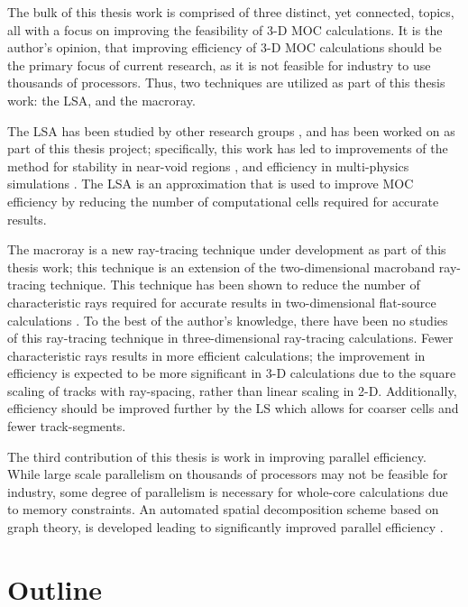 {{        The bulk of this thesis work is comprised of three distinct, yet connected, topics, all with a focus on improving the feasibility of 3-D \ac{MOC} calculations.
        It is the author's opinion, that improving efficiency of 3-D \ac{MOC} calculations should be the primary focus of current research, as it is not feasible for industry to use thousands of processors.
        Thus, two techniques are utilized as part of this thesis work: the \acf{LSA}, and the macroray.

        The \ac{LSA} has been studied by other research groups \cite{Ferrer2016,Ferrer2018,Gunow2018}, and has been worked on as part of this thesis project; specifically, this work has led to improvements of the method for stability in near-void regions \cite{Fitzgerald2018}, and efficiency in multi-physics simulations \cite{Fitzgerald2019}.
        The \ac{LSA} is an approximation that is used to improve \ac{MOC} efficiency by reducing the number of computational cells required for accurate results.

        The macroray is a new ray-tracing technique under development as part of this thesis work; this technique is an extension of the two-dimensional macroband \cite{Villarino1992} ray-tracing technique.
        This technique has been shown to reduce the number of characteristic rays required for accurate results in two-dimensional flat-source calculations \cite{Yamamoto2005,Fevotte2007}.
        To the best of the author's knowledge, there have been no studies of this ray-tracing technique in three-dimensional ray-tracing calculations.
        Fewer characteristic rays results in more efficient calculations; the improvement in efficiency is expected to be more significant in 3-D calculations due to the square scaling of tracks with ray-spacing, rather than linear scaling in 2-D.
        Additionally, efficiency should be improved further by the \ac{LS} which allows for coarser cells and fewer track-segments.

        The third contribution of this thesis is work in improving parallel efficiency.
        While large scale parallelism on thousands of processors may not be feasible for industry, some degree of parallelism is necessary for whole-core calculations due to memory constraints.
        An automated spatial decomposition scheme based on graph theory, is developed leading to significantly improved parallel efficiency \cite{Fitzgerald2017,Fitzgerald2019a}.
    }
    \section{Outline}{\label{sec:Introduction:Outline}
    }

    \printbibliography
}